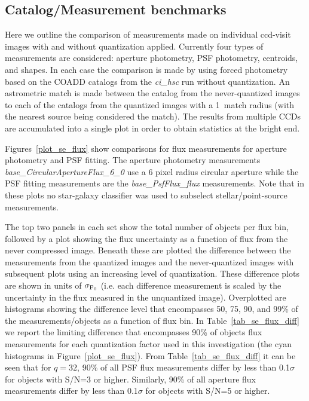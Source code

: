 \clearpage

\subsection{Catalog/Measurement benchmarks}

Here we outline the comparison of measurements made on individual ccd-visit images with and without 
quantization applied.  Currently four types of measurements are considered: aperture photometry, 
PSF photometry, centroids, and shapes.  In each case the comparison is made by using forced 
photometry based on the COADD catalogs from the {\it ci\_hsc} run without quantization.
An astrometric match is made between the catalog from the never-quantized images to each of the
catalogs from the quantized images with a 1\arcsec\ match radius (with the nearest source being
considered the match).  The results from multiple CCDs are accumulated into a single plot in order
to obtain statistics at the bright end.

Figures~\ref{plot_se_flux} show comparisons for flux measurements for aperture photometry 
and PSF fitting.  The aperture photometry measurements {\it base\_CircularApertureFlux\_6\_0} 
use a 6 pixel radius circular aperture while the PSF fitting measurements are the
{\it base\_PsfFlux\_flux} measurements.  Note that in these plots no star-galaxy classifier 
was used to subselect stellar/point-source measurements.

The top two panels in each set show the total number of objects per flux bin, followed by a plot 
showing the flux uncertainty as a function of flux from the never compressed image.  Beneath these 
are plotted the difference between the measurements from the quantized images and the never-quantized 
images with subsequent plots using an increasing level of quantization.  These difference 
plots are shown in units of $\sigma_{\rm F_0}$ (i.e. each difference measurement is scaled by the
uncertainty in the flux measured in the unquantized image).  Overplotted are histograms showing the 
difference level that encompasses 50, 75, 90, and 99\% of the measurements/objects as a function 
of flux bin.  In Table~\ref{tab_se_flux_diff} we report the limiting difference that encompasses
90\% of objects flux measurements for each quantization factor used in this investigation (the cyan
histograms in Figure~\ref{plot_se_flux}).  From Table~\ref{tab_se_flux_diff} it can be seen
that for $q=32$, 90\% of all PSF flux measurements differ by less than 0.1$\sigma$ for objects 
with S/N=3 or higher.   Similarly, 90\% of all aperture flux measurements differ by less than 0.1$\sigma$
for objects with S/N=5 or higher.

